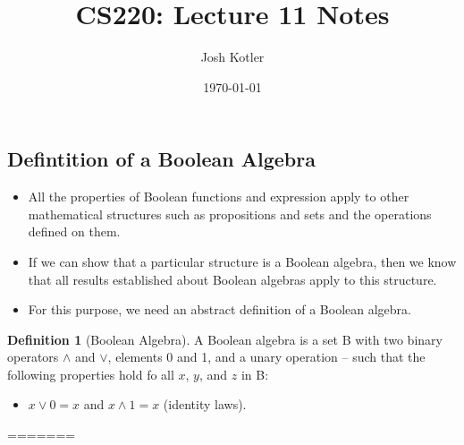 \documentclass{article}
\theoremstyle{definition}
\newtheorem{definition}{Definition}[section]
\begin{document}
\subsection{Defintition of a Boolean Algebra}
\begin{itemize}
    \item All the properties of Boolean functions and expression
        apply to other mathematical structures such as propositions
        and sets and the operations defined on them.
    \item If we can show that a particular structure is a Boolean algebra,
        then we know that all results established about Boolean algebras apply
        to this structure.
    \item For this purpose, we need an abstract definition of a Boolean algebra.
\end{itemize}
\begin{definition}[Boolean Algebra] A Boolean algebra is a set B with two binary operators
    $\land$ and $\lor$, elements 0 and 1, and a unary operation --
    such that the following properties hold fo all $x$, $y$, and $z$ in
    B:
    \begin{itemize}
        \item $x \lor 0 = x$ and $x \land 1 = x$ (identity laws).
    \end{itemize}
\end{definition}
=======

\title{CS220: Lecture 11 Notes}
\author{Josh Kotler}
\date{\today}
\end{document}
